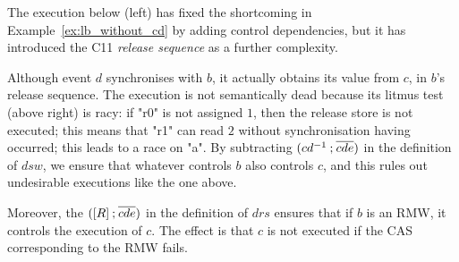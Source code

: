 \begin{Example}
\label{ex:lb_bad_rs}
The execution below (left) has fixed the shortcoming in
Example~\ref{ex:lb_without_cd} by adding control dependencies, but it
has introduced the C11 \emph{release sequence} as a further
complexity.
%
\begin{center}
\end{center}
%
Although event $d$ synchronises with $b$, it actually obtains its
value from $c$, in $b$'s release sequence. The execution is not
semantically dead because its litmus test (above right) is racy: if
"r0" is not assigned $1$, then the release store is not executed; this
means that "r1" can read $2$ without synchronisation having occurred;
this leads to a race on "a". By subtracting
$(cd^{-1}\mathbin{;} \overline{cde})$ in the definition of $dsw$, we ensure that
whatever controls $b$ also controls $c$, and this rules out
undesirable executions like the one above.

Moreover, the $({[R]}\mathbin{;} \overline{cde})$ in the definition of $drs$
ensures that if $b$ is an RMW, it controls the execution of $c$. The
effect is that $c$ is not executed if the CAS corresponding to the RMW
fails.
%
\end{Example}

